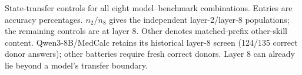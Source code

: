 \begin{table}[t]
\centering
\caption{State-transfer controls for all eight model--benchmark combinations.
Entries are accuracy percentages. $n_2/n_8$ gives the independent layer-2/layer-8
populations; the remaining controls are at layer 8. Other denotes matched-prefix
other-skill content. Qwen3-8B/MedCalc retains its historical layer-8 screen
(124/135 correct donor answers); other batteries require fresh correct donors.
Layer 8 can already lie beyond a model's transfer boundary.}
\label{tab:probe}
\setlength{\tabcolsep}{3pt}

\end{table}
